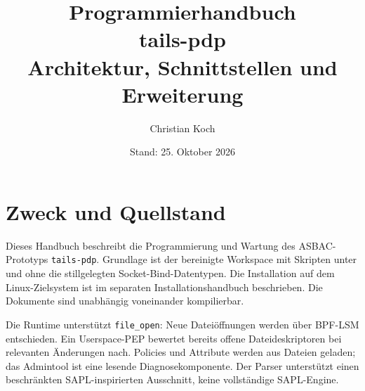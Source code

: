 \documentclass[12pt,a4paper]{article}
\title{Programmierhandbuch\\tails-pdp\\\large Architektur, Schnittstellen und Erweiterung}
\author{Christian Koch}
\date{Stand: 25. Oktober 2026}
\begin{document}
\hypersetup{pageanchor=false}
\maketitle
\thispagestyle{empty}

\clearpage
{}
\hypersetup{pageanchor=true}
\tableofcontents

\clearpage
{}

\section{Zweck und Quellstand}
Dieses Handbuch beschreibt die Programmierung und Wartung des ASBAC-Prototyps
\texttt{tails-pdp}. Grundlage ist der bereinigte Workspace mit Skripten unter
 und ohne die stillgelegten Socket-Bind-Datentypen.
Die Installation auf dem Linux-Zielsystem ist im separaten Installationshandbuch
beschrieben. Die Dokumente sind unabhängig voneinander kompilierbar.

Die Runtime unterstützt \texttt{file\_open}: Neue Dateiöffnungen werden über BPF-LSM
entschieden. Ein Userspace-PEP bewertet bereits offene Dateideskriptoren bei
relevanten Änderungen nach. Policies und Attribute werden aus Dateien geladen;
das Admintool ist eine lesende Diagnosekomponente. Der Parser unterstützt einen
beschränkten SAPL-inspirierten Ausschnitt, keine vollständige SAPL-Engine.
\end{document}
